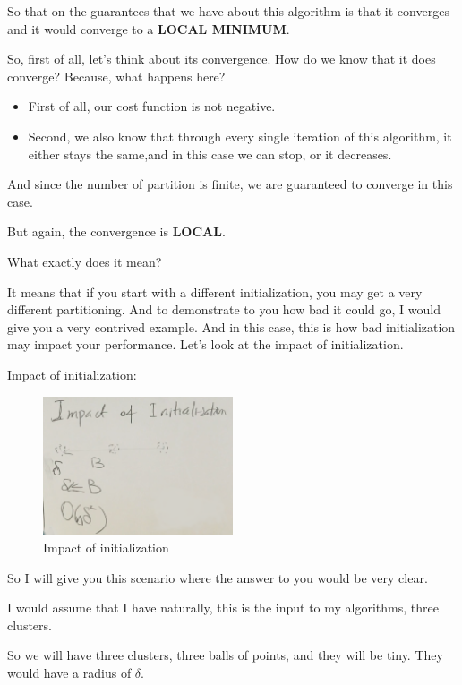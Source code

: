 \documentclass[a4paper, 12pt]{article}
\begin{document}
So that on the guarantees that we have about this algorithm is that it converges
and it would converge to a \textbf{LOCAL MINIMUM}.

So, first of all, let's think about its convergence. How do we know that it does
converge? Because, what happens here?

\begin{itemize}
\item First of all, our cost function is not negative.
\item Second, we also know that through every single iteration of this algorithm, it
either stays the same,and in this case we can stop, or it decreases.
\end{itemize}

And since the number of partition is finite, we are guaranteed to converge in
this case.

But again, the convergence is \textbf{LOCAL}.

What exactly does it mean?

It means that if you start with a different initialization, you may get a very
different partitioning. And to demonstrate to you how bad it could go, I would
give you a very contrived example. And in this case, this is how bad
initialization may impact your performance. Let's look at the impact of
initialization.

Impact of initialization:

\begin{figure}[H]
\centering
\includegraphics[width=0.5\textwidth]{./pic/04-08-fig-01.png}
\caption{\label{fig:orgfe450b6}Impact of initialization}
\end{figure}

So I will give you this scenario where the answer to you would be very clear.

I would assume that I have naturally, this is the input to my algorithms, three
clusters.

So we will have three clusters, three balls of points, and they will be tiny.
They would have a radius of \(\delta\).
\end{document}
